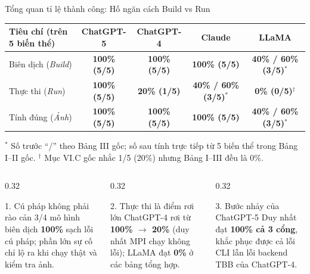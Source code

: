 \documentclass[aspectratio=169,10pt]{beamer}
\newcommand{\currentpart}{Mở đầu}
\newcommand{\setpart}[1]{\renewcommand{\currentpart}{#1}}
\newcommand{\ok}[1]{\textcolor{OkGreen}{\bfseries #1}}
\newcommand{\bad}[1]{\textcolor{BadRed}{\bfseries #1}}
\newcommand{\warn}[1]{\textcolor{WarnAmber}{\bfseries #1}}
\begin{document}
\setpart{Phần 3 \textbullet{} Đồng Đức Dương}

\begin{frame}{Tổng quan tỉ lệ thành công: Hố ngăn cách Build vs Run}
\centering
\footnotesize
\renewcommand{\arraystretch}{1.32}
\begin{tabular}{@{}lcccc@{}}
\toprule
\rowcolor{BlueSoft}
\textbf{Tiêu chí (trên 5 biến thể)} & \textbf{ChatGPT-5} & \textbf{ChatGPT-4} & \textbf{Claude} & \textbf{LLaMA} \\
\midrule
Biên dịch (\emph{Build}) & \ok{100\% (5/5)} & \ok{100\% (5/5)} & \ok{100\% (5/5)} & \warn{40\% / 60\% (3/5)$^*$} \\
Thực thi (\emph{Run})    & \ok{100\% (5/5)} & \bad{20\% (1/5)} & \warn{40\% / 60\% (3/5)$^*$} & \bad{0\% (0/5)$^\dagger$} \\
Tính đúng (\emph{Ảnh})   & \ok{100\% (5/5)} & \ok{100\% (5/5)} & \ok{100\% (5/5)} & \warn{40\% / 60\% (3/5)$^*$} \\
\bottomrule
\end{tabular}

\vspace{0.14cm}
{\tiny\color{Muted}$^*$ Số trước ``/'' theo Bảng III gốc; số sau tính trực tiếp từ 5 biến thể trong Bảng I--II gốc. \;$^\dagger$ Mục VI.C gốc nhắc 1/5 (20\%) nhưng Bảng I--III đều là 0\%.}

\vspace{0.20cm}
\begin{columns}[T,totalwidth=\textwidth]
  \begin{column}{0.32\textwidth}
    \begin{bluebox}[height=2.15cm]{1. Cú pháp không phải rào cản}
      \scriptsize 3/4 mô hình biên dịch \textbf{100\%} sạch lỗi cú pháp; phần lớn sự cố chỉ lộ ra khi chạy thật và kiểm tra ảnh.
    \end{bluebox}
  \end{column}
  \begin{column}{0.32\textwidth}
    \begin{bluebox}[height=2.15cm]{2. Thực thi là điểm rơi lớn}
      \scriptsize ChatGPT-4 rơi từ \textbf{100\% $\to$ 20\%} (duy nhất MPI chạy không lỗi); LLaMA đạt \textbf{0\%} ở các bảng tổng hợp.
    \end{bluebox}
  \end{column}
  \begin{column}{0.32\textwidth}
    \begin{bluebox}[height=2.15cm]{3. Bước nhảy của ChatGPT-5}
      \scriptsize Duy nhất đạt \textbf{100\% cả 3 cổng}, khắc phục được cả lỗi CLI lẫn lỗi backend TBB của ChatGPT-4.
    \end{bluebox}
  \end{column}
\end{columns}
\end{frame}
\end{document}

